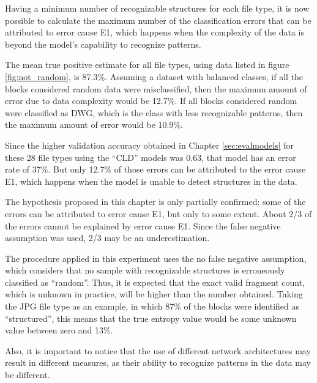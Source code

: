 Having a minimum number of recognizable structures for each file type, it is now possible to calculate the maximum number of the classification errors that can be attributed to error cause E1, which happens when the complexity of the data is beyond the model’s capability to recognize patterns.

The mean true positive estimate for all file types, using data listed in figure \ref{fig:not_random}, is 87.3\%.  Assuming a dataset with balanced classes, if all the blocks considered random data were misclassified, then the maximum amount of error due to data complexity would be 12.7\%. If all blocks considered random were classified as DWG, which is the class with less recognizable patterns, then the maximum amount of error would be 10.9\%.

Since the higher validation accuracy obtained in Chapter \ref{sec:evalmodels} for these 28 file types using the ``CLD'' models was 0.63, that model has an error rate of 37\%. But only 12.7\% of those errors can be attributed to the error cause E1, which happens when the model is unable to detect structures in the data.

The hypothesis proposed in this chapter is only partially confirmed: some of the errors can be attributed to error cause E1, but only to some extent. About 2/3 of the errors cannot be explained by error cause E1. Since the false negative assumption was used, 2/3 may be an underestimation.


The procedure applied in this experiment uses the no false negative assumption, which considers that no sample with recognizable structures is erroneously classified as ``random''. Thus, it is expected that the exact valid fragment count, which is unknown in practice, will be higher than the number obtained. Taking the JPG file type as an example, in which 87\% of the blocks were identified as ``structured'', this means that the true entropy value would be some unknown value between zero and 13\%.

Also, it is important to notice that the use of different network architectures may result in different measures, as their ability to recognize patterns in the data may be different.

